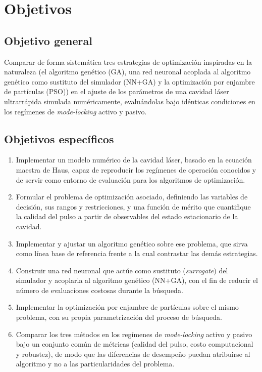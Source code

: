 \section{Objetivos}
\label{sec:objetivos}
 
\subsection*{Objetivo general}
 
Comparar de forma sistemática tres estrategias de optimización inspiradas en la naturaleza (el algoritmo genético (GA), una red neuronal acoplada al algoritmo genético como sustituto del simulador (NN+GA) y la optimización por enjambre de partículas (PSO)) en el ajuste de los parámetros de una cavidad láser ultrarrápida simulada numéricamente, evaluándolas bajo idénticas condiciones en los regímenes de \emph{mode-locking} activo y pasivo.
 
\subsection*{Objetivos específicos}
 
\begin{enumerate}
  \item Implementar un modelo numérico de la cavidad láser, basado en la ecuación maestra de Haus, capaz de reproducir los regímenes de operación conocidos y de servir como entorno de evaluación para los algoritmos de optimización.
 
  \item Formular el problema de optimización asociado, definiendo las variables de decisión, sus rangos y restricciones, y una función de mérito que cuantifique la calidad del pulso a partir de observables del estado estacionario de la cavidad.
 
  \item Implementar y ajustar un algoritmo genético sobre ese problema, que sirva como línea base de referencia frente a la cual contrastar las demás estrategias.
 
  \item Construir una red neuronal que actúe como sustituto (\emph{surrogate}) del simulador y acoplarla al algoritmo genético (NN+GA), con el fin de reducir el número de evaluaciones costosas durante la búsqueda.
 
  \item Implementar la optimización por enjambre de partículas sobre el mismo problema, con su propia parametrización del proceso de búsqueda.
 
  \item Comparar los tres métodos en los regímenes de \emph{mode-locking} activo y pasivo bajo un conjunto común de métricas (calidad del pulso, costo computacional y robustez), de modo que las diferencias de desempeño puedan atribuirse al algoritmo y no a las particularidades del problema.
\end{enumerate}
 
